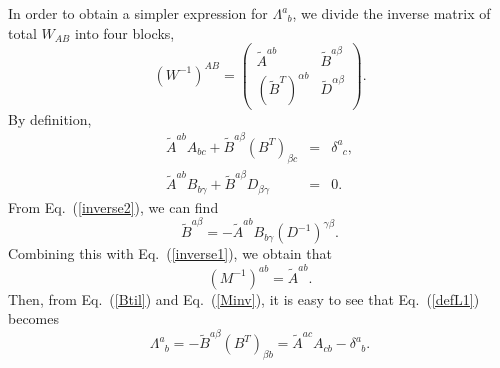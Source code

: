 \documentclass[12pt,epsf]{article}
\def\sp{\phantom{a}}
\begin{document}
In order to obtain a simpler expression for $\Lambda^a_{\sp b}$,
we divide the inverse matrix of total $W_{AB}$ into four blocks,
\begin{equation}
(W^{-1})^{AB}=\left(\begin{array}{cc}
 \tilde{A}^{ab} & \tilde{B}^{a\beta} \\
 (\tilde{B}^T)^{\alpha b} & \tilde{D}^{\alpha\beta}
\end{array}\right).
\end{equation}
By definition,
\begin{eqnarray}
   \tilde{A}^{ab}A_{bc}+\tilde{B}^{a\beta}(B^T)_{\beta c}
       &=& \delta^a_{\sp c}, \label{inverse1} \\
   \tilde{A}^{ab}B_{b\gamma}+\tilde{B}^{a\beta}
   D_{\beta\gamma} &=& 0. \label{inverse2}
\end{eqnarray}
From Eq.~(\ref{inverse2}), we can find
\begin{equation}
 \tilde{B}^{a\beta}=-\tilde{A}^{ab}B_{b\gamma}
        (D^{-1})^{\gamma\beta}.
 \label{Btil}
\end{equation}
Combining this with Eq.~(\ref{inverse1}),
we obtain that
\begin{equation}
  (M^{-1})^{ab}= \tilde{A}^{ab}.
\label{Minv}
\end{equation}
Then, from Eq.~(\ref{Btil}) and Eq.~(\ref{Minv}),
it is easy to see that Eq.~(\ref{defL1}) becomes
\begin{equation}
 \Lambda^a_{\sp b}=-\tilde{B}^{a\beta}(B^T)_{\beta b}
    =\tilde{A}^{ac}A_{cb}-\delta^a_{\sp b}.
\label{defL2}
\end{equation}
\end{document}
